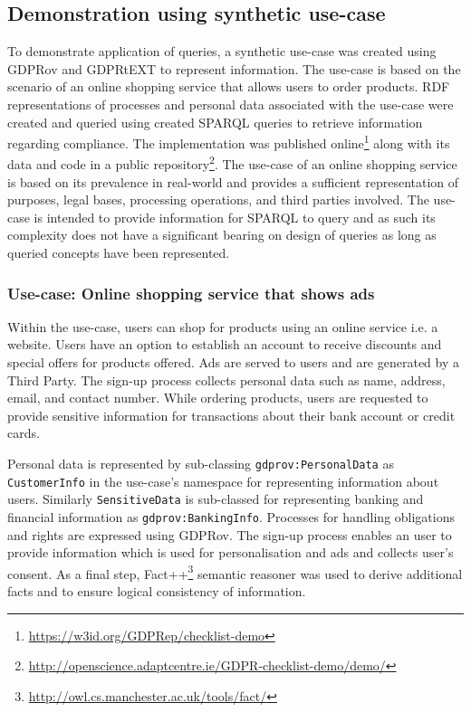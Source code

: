 \subsection{Demonstration using synthetic use-case} \label{sec:testing:sparql:demo}
To demonstrate application of queries, a synthetic use-case was created using GDPRov and GDPRtEXT to represent information.
The use-case is based on the scenario of an online shopping service that allows users to order products.
RDF representations of processes and personal data associated with the use-case were created and queried using created SPARQL queries to retrieve information regarding compliance.
The implementation was published online\footnote{\url{https://w3id.org/GDPRep/checklist-demo}} along with its data and code in a public repository\footnote{\url{http://openscience.adaptcentre.ie/GDPR-checklist-demo/demo/}}.
The use-case of an online shopping service is based on its prevalence in real-world and provides a sufficient representation of purposes, legal bases, processing operations, and third parties involved.
The use-case is intended to provide information for SPARQL to query and as such its complexity does not have a significant bearing on design of queries as long as queried concepts have been represented.

\subsubsection{Use-case: Online shopping service that shows ads}
Within the use-case, users can shop for products using an online service i.e. a website. Users have an option to establish an account to receive discounts and special offers for products offered.
Ads are served to users and are generated by a Third Party.
The sign-up process collects personal data such as name, address, email, and contact number.
While ordering products, users are requested to provide sensitive information for transactions about their bank account or credit cards.

Personal data is represented by sub-classing \texttt{gdprov:PersonalData} as \texttt{CustomerInfo} in the use-case's namespace for representing information about users.
Similarly \texttt{SensitiveData} is sub-classed for representing banking and financial information as \texttt{gdprov:BankingInfo}.
Processes for handling obligations and rights are expressed using GDPRov.
The sign-up process enables an user to provide information which is used for personalisation and ads and collects user's consent.
As a final step, Fact++\footnote{\url{http://owl.cs.manchester.ac.uk/tools/fact/}}
semantic reasoner was used to derive additional facts and to ensure logical consistency of information.

